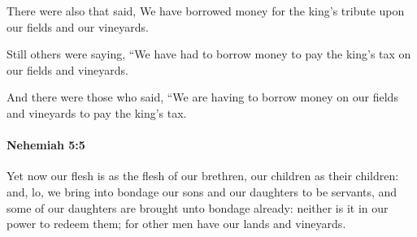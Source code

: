 			\begin{versebox}
					\item[BHS] 
					\item[LXX] 
					\item[ASV] There were also that said, We have borrowed money for the king's tribute upon our fields and our vineyards.
					\item[NIV] Still others were saying, “We have had to borrow money to pay the king’s tax on our fields and vineyards.
					\item[NRSV] And there were those who said, “We are having to borrow money on our fields and vineyards to pay the king’s tax.
			\end{versebox}

		\paragraph{Nehemiah 5:5} %
			\label{NEHEMIAH-5-5}

			Yet now our flesh is as the flesh of our brethren, our children as their children: and, lo, we bring into bondage our sons and our daughters to be servants, and some of our daughters are brought unto bondage already: neither is it in our power to redeem them; for other men have our lands and vineyards.

